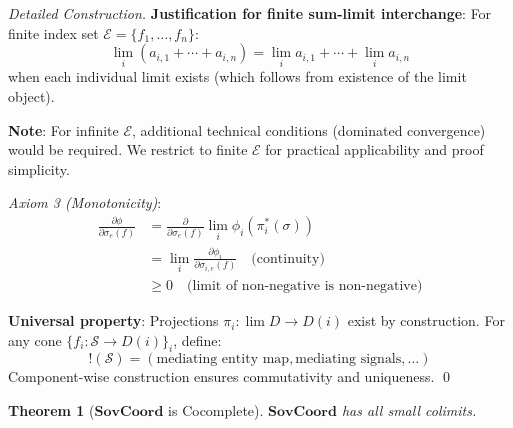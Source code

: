 \documentclass[11pt,a4paper]{article}
\newtheorem{theorem}{Theorem}[section]
\theoremstyle{definition}
\theoremstyle{remark}
\newcommand{\E}{\mathcal{E}}
\newcommand{\SovCoord}{\mathbf{SovCoord}}
\begin{document}
\begin{proof}[Detailed Construction]
\textbf{Justification for finite sum-limit interchange}: For finite index set $\E = \{f_1, \ldots, f_n\}$:
\[ \lim_i (a_{i,1} + \cdots + a_{i,n}) = \lim_i a_{i,1} + \cdots + \lim_i a_{i,n} \]
when each individual limit exists (which follows from existence of the limit object).

\textbf{Note}: For infinite $\E$, additional technical conditions (dominated convergence) would be required. We restrict to finite $\E$ for practical applicability and proof simplicity.

\textit{Axiom 3 (Monotonicity)}:
\begin{align*}
\frac{\partial \phi}{\partial \sigma_e(f)} &= \frac{\partial}{\partial \sigma_e(f)} \lim_i \phi_i(\pi_i^*(\sigma)) \\
&= \lim_i \frac{\partial \phi_i}{\partial \sigma_{i,e}(f)} \quad \text{(continuity)} \\
&\ge 0 \quad \text{(limit of non-negative is non-negative)}
\end{align*}

\textbf{Universal property}: Projections $\pi_i: \lim D \to D(i)$ exist by construction. For any cone $\{f_i: \mathcal{S} \to D(i)\}_i$, define:
\[ !(\mathcal{S}) = (\text{mediating entity map}, \text{mediating signals}, \ldots) \]
Component-wise construction ensures commutativity and uniqueness. \qed
\end{proof}

\begin{theorem}[$\SovCoord$ is Cocomplete]
\label{thm:cocomplete}
$\SovCoord$ has all small colimits.
\end{theorem}
\end{document}
